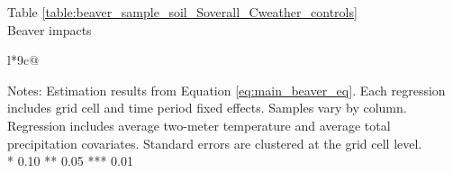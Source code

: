 \begin{table}[htb]
\captionlistentry[table]{}
\label{table:beaver_sample_soil_Soverall_Cweather_controls}
\centering
Table \ref{table:beaver_sample_soil_Soverall_Cweather_controls} \\
Beaver impacts \\
\begin{threeparttable}
\begin{tabulary}{\textwidth}{l*{9}{c}@{}}
\toprule \toprule
\noalign{\smallskip}
\noalign{\smallskip}
\midrule \bottomrule
\end{tabulary}
\medskip
\begin{tablenotes}[flushleft]
\setlength{}
\item
\footnotesize
\justify
Notes: Estimation results from Equation \eqref{eq:main_beaver_eq}.
Each regression includes grid cell and time period fixed effects.
Samples vary by column. Regression includes average two-meter temperature and average total precipitation covariates.
Standard errors are clustered at the grid cell level. \\
\mbox{*} 0.10 ** 0.05 *** 0.01
\end{tablenotes}
\end{threeparttable}
\end{table}
